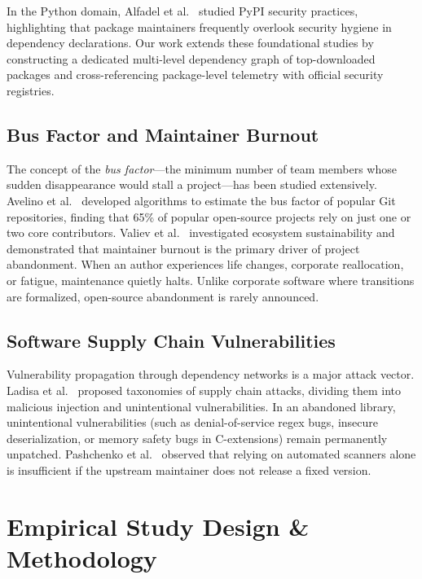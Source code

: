 \documentclass[conference]{IEEEtran}
\begin{document}
In the Python domain, Alfadel et al.~\cite{alfadel2021empirical} studied PyPI security practices, highlighting that package maintainers frequently overlook security hygiene in dependency declarations. Our work extends these foundational studies by constructing a dedicated multi-level dependency graph of top-downloaded packages and cross-referencing package-level telemetry with official security registries.

\subsection{Bus Factor and Maintainer Burnout}

The concept of the \textit{bus factor}---the minimum number of team members whose sudden disappearance would stall a project---has been studied extensively. Avelino et al.~\cite{avelino2016assessing} developed algorithms to estimate the bus factor of popular Git repositories, finding that 65\% of popular open-source projects rely on just one or two core contributors. Valiev et al.~\cite{valiev2018ecosystem} investigated ecosystem sustainability and demonstrated that maintainer burnout is the primary driver of project abandonment. When an author experiences life changes, corporate reallocation, or fatigue, maintenance quietly halts. Unlike corporate software where transitions are formalized, open-source abandonment is rarely announced.

\subsection{Software Supply Chain Vulnerabilities}

Vulnerability propagation through dependency networks is a major attack vector. Ladisa et al.~\cite{ladisa2023sok} proposed taxonomies of supply chain attacks, dividing them into malicious injection and unintentional vulnerabilities. In an abandoned library, unintentional vulnerabilities (such as denial-of-service regex bugs, insecure deserialization, or memory safety bugs in C-extensions) remain permanently unpatched. Pashchenko et al.~\cite{pashchenko2020qualitative} observed that relying on automated scanners alone is insufficient if the upstream maintainer does not release a fixed version.

\section{Empirical Study Design \& Methodology}
\end{document}
